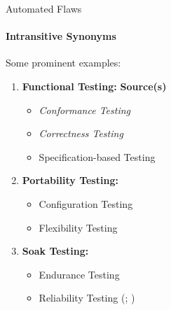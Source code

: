 \begin{frame}{Automated Flaws}
    \framesubtitle{Intransitive Synonyms}
    Some prominent examples: \vspace{0.25cm}
    \begin{enumerate}
        \item \textbf{Functional Testing:} \hfill \textbf{Source(s)}
              \begin{itemize}
                  \item \emph{Conformance Testing} {\hfill \tiny \citep[p.~5\=/7]{SWEBOK2025}}
                  \item \emph{Correctness Testing} {\hfill \tiny \citep[p.~5\=/7]{SWEBOK2025}}
                  \item Specification-based Testing {\hfill \tiny \citep[p.~196; \dots{}]{IEEE2017}}
              \end{itemize}\pause
              \vspace{0.25cm}
        \item \textbf{Portability Testing:}
              \begin{itemize}
                  \item Configuration Testing {\hfill \tiny \citep[p.~43]{Kam2008}}
                  \item Flexibility Testing {\hfill \tiny \citep{ISO_IEC2023a}}
              \end{itemize}
              \vspace{0.25cm}
        \item \textbf{Soak Testing:}
              \begin{itemize}
                  \item Endurance Testing {\hfill \tiny \citep[p.~39]{IEEE2021c}}
                  \item Reliability Testing {\hfill \tiny (\citealp[Tab.~2]{Gerrard2000a};
                                \citeyear[Tab.~1, p.~26]{Gerrard2000b})}
              \end{itemize}

\end{enumerate}
\end{frame}

